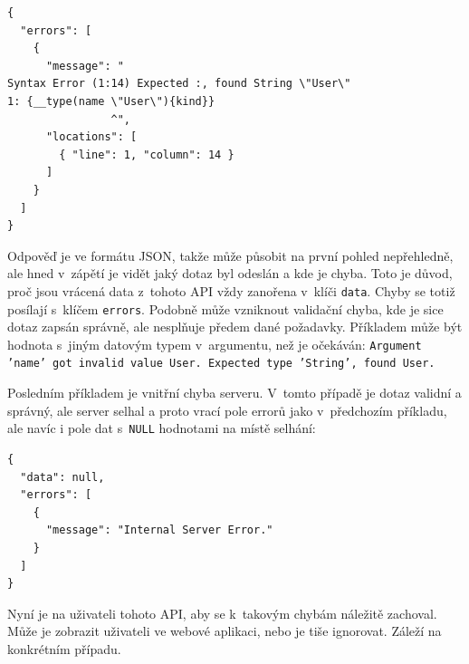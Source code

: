 \begin{verbatim}
{
  "errors": [
    {
      "message": "
Syntax Error (1:14) Expected :, found String \"User\"
1: {__type(name \"User\"){kind}}
                ^",
      "locations": [
        { "line": 1, "column": 14 }
      ]
    }
  ]
}
\end{verbatim}

Odpověď je ve formátu JSON, takže může působit na první pohled ne\-pře\-hled\-ně, ale hned v~zápětí je vidět jaký dotaz byl odeslán a kde je chyba. Toto je důvod, proč jsou vrácená data z~tohoto API vždy zanořena v~klíči \texttt{data}. Chyby se totiž posílají s~klíčem \texttt{errors}. Podobně může vzniknout validační chyba, kde je sice dotaz zapsán správně, ale nesplňuje předem dané požadavky. Příkladem může být hodnota s~jiným datovým typem v~argumentu, než je očekáván: \texttt{Argument 'name' got invalid value User. Expected type 'String', found User.}

Posledním příkladem je vnitřní chyba serveru. V~tomto případě je dotaz validní a správný, ale server selhal a proto vrací pole errorů jako v~předchozím příkladu, ale navíc i pole dat s~\texttt{NULL} hodnotami na místě selhání:

\begin{verbatim}
{
  "data": null,
  "errors": [
    {
      "message": "Internal Server Error."
    }
  ]
}
\end{verbatim}

Nyní je na uživateli tohoto API, aby se k~takovým chybám náležitě zachoval. Může je zobrazit uživateli ve webové aplikaci, nebo je tiše ignorovat. Záleží na konkrétním případu.